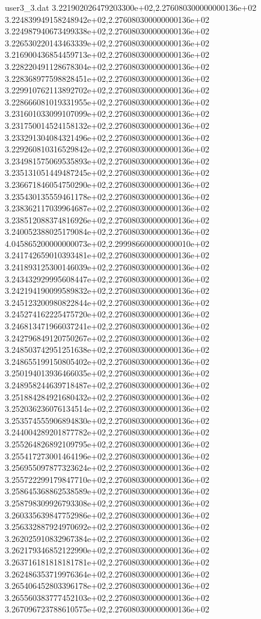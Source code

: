 \begin{filecontents}{user3_3.dat}
3.221902026479203300e+02,2.276080300000000136e+02
3.224839949158248942e+02,2.276080300000000136e+02
3.224987940673499338e+02,2.276080300000000136e+02
3.226530220143463339e+02,2.276080300000000136e+02
3.216900436854459713e+02,2.276080300000000136e+02
3.228220491128678304e+02,2.276080300000000136e+02
3.228368977598828451e+02,2.276080300000000136e+02
3.229910762113892702e+02,2.276080300000000136e+02
3.228666081019331955e+02,2.276080300000000136e+02
3.231601033099107099e+02,2.276080300000000136e+02
3.231750014524158132e+02,2.276080300000000136e+02
3.233291304084321496e+02,2.276080300000000136e+02
3.229260810316529842e+02,2.276080300000000136e+02
3.234981575069535893e+02,2.276080300000000136e+02
3.235131051449487245e+02,2.276080300000000136e+02
3.236671846054750290e+02,2.276080300000000136e+02
3.235430135559461178e+02,2.276080300000000136e+02
3.238362117039964687e+02,2.276080300000000136e+02
3.238512088374816926e+02,2.276080300000000136e+02
3.240052388025179084e+02,2.276080300000000136e+02
4.045865200000000073e+02,2.299986600000000010e+02
3.241742659010393481e+02,2.276080300000000136e+02
3.241893125300146039e+02,2.276080300000000136e+02
3.243432929995608447e+02,2.276080300000000136e+02
3.242194190099589832e+02,2.276080300000000136e+02
3.245123200980822844e+02,2.276080300000000136e+02
3.245274162225475720e+02,2.276080300000000136e+02
3.246813471966037241e+02,2.276080300000000136e+02
3.242796849120750267e+02,2.276080300000000136e+02
3.248503742951251638e+02,2.276080300000000136e+02
3.248655199150805402e+02,2.276080300000000136e+02
3.250194013936466035e+02,2.276080300000000136e+02
3.248958244639718487e+02,2.276080300000000136e+02
3.251884284921680432e+02,2.276080300000000136e+02
3.252036236076134514e+02,2.276080300000000136e+02
3.253574555906894830e+02,2.276080300000000136e+02
3.244004289201877782e+02,2.276080300000000136e+02
3.255264826892109795e+02,2.276080300000000136e+02
3.255417273001464196e+02,2.276080300000000136e+02
3.256955097877323624e+02,2.276080300000000136e+02
3.255722299179847710e+02,2.276080300000000136e+02
3.258645368862538589e+02,2.276080300000000136e+02
3.258798309926793308e+02,2.276080300000000136e+02
3.260335639847752986e+02,2.276080300000000136e+02
3.256332887924970692e+02,2.276080300000000136e+02
3.262025910832967384e+02,2.276080300000000136e+02
3.262179346852122990e+02,2.276080300000000136e+02
3.263716181818181781e+02,2.276080300000000136e+02
3.262486353719976364e+02,2.276080300000000136e+02
3.265406452803396178e+02,2.276080300000000136e+02
3.265560383777452103e+02,2.276080300000000136e+02
3.267096723788610575e+02,2.276080300000000136e+02

\end{filecontents}
